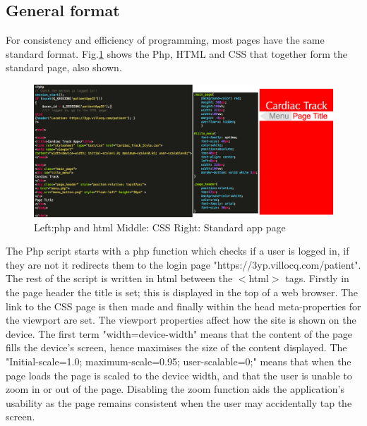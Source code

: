 \documentclass[11pt]{article}
\begin{document}
\subsection{General format}
For consistency and efficiency of programming, most pages have the same standard format. Fig.\ref{appstandard} shows the Php, HTML and CSS that together form the standard page, also shown.
\begin{figure}[h!] 
\includegraphics[width=\linewidth]{appstandard.png}
\caption{Left:php and html Middle: CSS Right: Standard app page \label{appstandard}}
\end{figure} 
The Php script starts with a php function which checks if a user is logged in, if they are not it redirects them to the login page "https://3yp.villocq.com/patient". 
\\ \indent
The rest of the script is written in html between the $<$html$>$ tags. Firstly in the page header the title is set; this is displayed in the top of a web browser. The link to the CSS page is then made and finally within the head meta-properties for the viewport are set. The viewport properties affect how the site is shown on the device. The first term "width=device-width" means that the content of the page fills the device's screen, hence maximises the size of the content displayed. The "Initial-scale=1.0; maximum-scale=0.95; user-scalable=0;" means that when the page loads the page is scaled to the device width, and that the user is unable to zoom in or out of the page. Disabling the zoom function aids the application's usability as the page remains consistent when the user may accidentally tap the screen. 
\\ \indent
\end{document}
